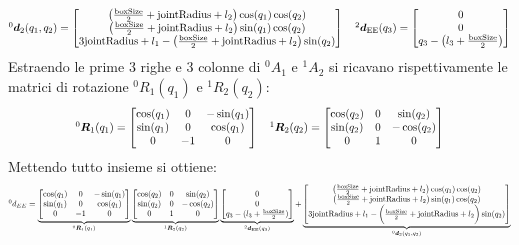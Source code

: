 \documentclass[11pt, a4paper]{report}
\begin{document}
\[
\scalebox{0.8}{$
^{0}\bm{d}_{2}(q_{1}, q_{2}) =
\begin{bmatrix}
    \left(\frac{\text{boxSize}}{2} + \text{jointRadius} + l_2\right)\cos(q_1)\cos(q_2) \\
    \left(\frac{\text{boxSize}}{2} + \text{jointRadius} + l_2\right)\sin(q_1)\cos(q_2) \\
    3\text{jointRadius} + l_1 - \left(\frac{\text{boxSize}}{2} + \text{jointRadius} + l_2\right)\sin(q_2)
\end{bmatrix}
\quad
^{2}\bm{d}_{\text{EE}}(q_{3}) =
\begin{bmatrix}
    0\\
    0\\
    q_{3} - \left(l_{3} + \frac{\text{boxSize}}{2}\right)
\end{bmatrix}
$}
\]
Estraendo le prime 3 righe e 3 colonne di ${}^{0}A_{1}$ e ${}^{1}A_{2}$ si ricavano rispettivamente le matrici di rotazione ${}^{0}R_{1}(q_1)$ e ${}^{1}R_{2}(q_2)$:
\[
\scalebox{0.8}{$
^{0}\bm{R}_{1}(q_{1}) =
\begin{bmatrix}
    \cos(q_1) & 0 & -\sin(q_1) \\
    \sin(q_1) & 0 & \cos(q_1) \\
    0 & -1 & 0
\end{bmatrix}
\quad
^{1}\bm{R}_{2}(q_{2}) =
\begin{bmatrix}
    \cos(q_2) & 0 & \sin(q_2) \\
    \sin(q_2) & 0 & -\cos(q_2) \\
    0 & 1 & 0
\end{bmatrix}
$}
\]
Mettendo tutto insieme si ottiene:
\[
\scalebox{0.75}{$
{}^{0}d_{EE} =
\underbrace{\begin{bmatrix}
    \cos(q_1) & 0 & -\sin(q_1) \\
    \sin(q_1) & 0 & \cos(q_1) \\
    0 & -1 & 0
\end{bmatrix}}_{^{0}\bm{R}_{1}(q_{1})}
\underbrace{\begin{bmatrix}
    \cos(q_2) & 0 & \sin(q_2) \\
    \sin(q_2) & 0 & -\cos(q_2) \\
    0 & 1 & 0
\end{bmatrix}}_{^{1}\bm{R}_{2}(q_{2})}
\underbrace{\begin{bmatrix}
    0\\
    0\\
    q_{3} - (l_{3} + \frac{\text{boxSize}}{2})
\end{bmatrix}}_{^{2}\bm{d}_{\text{EE}}(q_{3})}
+
\underbrace{\begin{bmatrix}
    \left(\frac{\text{boxSize}}{2} + \text{jointRadius} + l_2\right)\cos(q_1)\cos(q_2) \\
    \left(\frac{\text{boxSize}}{2} + \text{jointRadius} + l_2\right)\sin(q_1)\cos(q_2) \\
    3\text{jointRadius} + l_1 - \biggl(\frac{\text{boxSize}}{2} + \text{jointRadius} + l_2\biggr)\sin(q_2)
\end{bmatrix}}_{^{0}\bm{d}_{2}(q_{1}, q_{2})}
$}
\]
\end{document}
